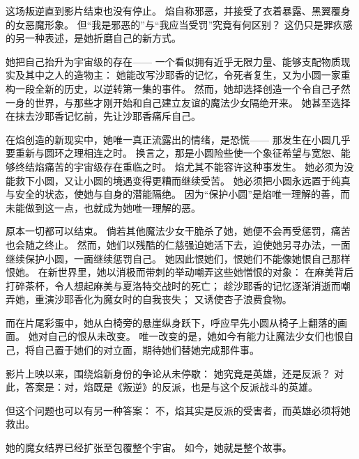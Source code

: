 这场叛逆直到影片结束也没有停止。
焰自称邪恶，并接受了衣着暴露、黑翼覆身的女恶魔形象。
但“我是邪恶的”与“我应当受罚”究竟有何区别？
这仍只是罪疚感的另一种表述，是她折磨自己的新方式。

她把自己抬升为宇宙级的存在——
一个看似拥有近乎无限力量、能够支配物质现实及其中之人的造物主：
她能改写沙耶香的记忆，令死者复生，又为小圆一家重构一段全新的历史，以逆转第一集的事件。
然而，她却选择创造一个令自己孑然一身的世界，与那些才刚开始和自己建立友谊的魔法少女隔绝开来。
她甚至选择在抹去沙耶香记忆前，先让沙耶香痛斥自己。

在焰创造的新现实中，她唯一真正流露出的情绪，是恐慌——
那发生在小圆几乎要重新与圆环之理相连之时。
换言之，那是小圆险些使一个象征希望与宽恕、能够终结焰痛苦的宇宙级存在重临之时。
焰尤其不能容许这种事发生。
她必须为没能救下小圆，又让小圆的境遇变得更糟而继续受苦。
她必须把小圆永远置于纯真与安全的状态，使她与自身的潜能隔绝。
因为“保护小圆”是焰唯一理解的善，而未能做到这一点，也就成为她唯一理解的恶。

原本一切都可以结束。
倘若其他魔法少女干脆杀了她，她便不会再受惩罚，痛苦也会随之终止。
然而，她们以残酷的仁慈强迫她活下去，迫使她另寻办法，一面继续保护小圆，一面继续惩罚自己。
她因此恨她们，恨她们不能像她恨自己那样恨她。
在新世界里，她以消极而带刺的举动嘲弄这些她憎恨的对象：
在麻美背后打碎茶杯，令人想起麻美与夏洛特交战时的死亡；
趁沙耶香的记忆逐渐消逝而嘲弄她，重演沙耶香化为魔女时的自我丧失；
又诱使杏子浪费食物。%

而在片尾彩蛋中，她从白椅旁的悬崖纵身跃下，呼应早先小圆从椅子上翻落的画面。
她对自己的恨从未改变。
唯一改变的是，她如今有能力让魔法少女们也恨自己，将自己置于她们的对立面，期待她们替她完成那件事。

影片上映以来，围绕焰新身份的争论从未停歇：
她究竟是英雄，还是反派？
对此，答案是：对，焰既是《叛逆》的反派，也是与这个反派战斗的英雄。

但这个问题也可以有另一种答案：
不，焰其实是反派的受害者，而英雄必须将她救出。

她的魔女结界已经扩张至包覆整个宇宙。
如今，她就是整个故事。
